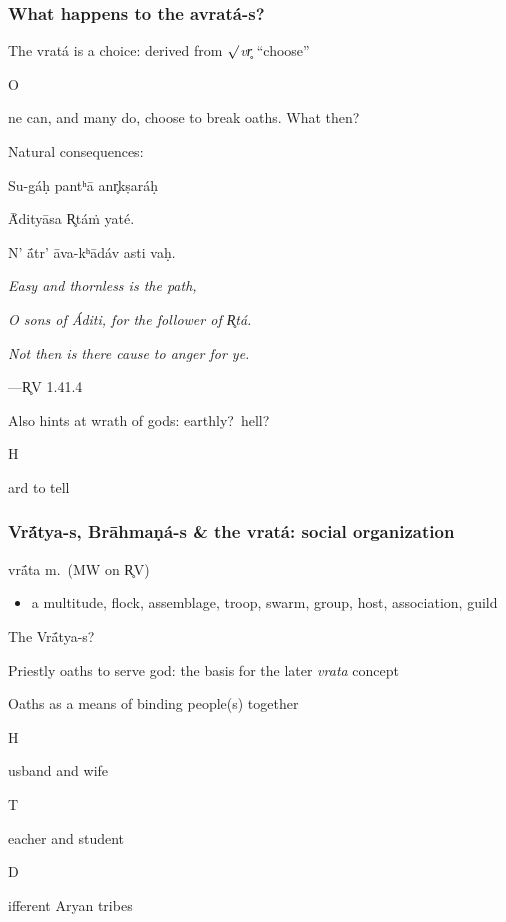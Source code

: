\documentclass[pdf]{beamer}
\newcommand{\Subitem}[1]{{\setlength\itemindent{12pt} \item[-] #1}}
\begin{document}
\begin{frame} \frametitle{What happens to the avratá-s?}
\begin{itemize}
	\item The vratá is a choice: derived from $\surd$\textit{vr̥} ``choose''
	\Subitem One can, and many do, choose to break oaths. What then?
	\item Natural consequences:
\end{itemize}
\begin{center}
	Su-gáḥ pantʰā anr̥kṣaráḥ

	Ā́dityāsa R̥táṁ yaté.

	N’ ā́tr’ āva-kʰādáv asti vaḥ.

	\vspace{12pt}

	\textit{Easy and thornless is the path,}

	\textit{O sons of Áditi, for the follower of R̥tá.}

	\textit{Not then is there cause to anger for ye.}

	\vspace{12pt}

 	---R̥V 1.41.4
\end{center}
\begin{itemize}
	\item Also hints at wrath of gods: earthly?~hell?
	\Subitem Hard to tell
\end{itemize}
\end{frame}

\begin{frame} \frametitle{Vrā́tya-s, Brāhmaṇá-s \& the vratá: social organization}
\begin{block} {vrā́ta m.~(MW on R̥V)}
\begin{itemize}
	\item a multitude, flock, assemblage, troop, swarm, group, host, association, guild
\end{itemize}
\end{block}
\begin{itemize}
	\item The Vrā́tya-s?
	\item Priestly oaths to serve god: the basis for the later \textit{vrata} concept
	\item Oaths as a means of binding people(s) together
	\Subitem Husband and wife
	\Subitem Teacher and student
	\Subitem Different Aryan tribes
\end{itemize}
\end{frame}
\end{document}
